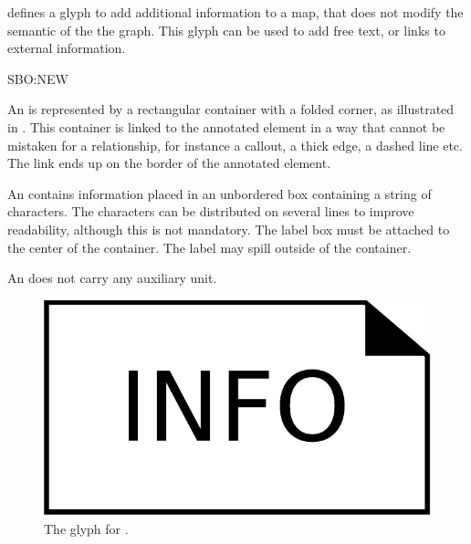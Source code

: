 
\SBGNERLone defines a glyph to add additional information to a map, that does not modify the semantic of the the graph. This glyph can be used to add free text, or links to external information.

\begin{glyphDescription}

\glyphSboTerm SBO:NEW

\glyphContainer An  is represented by a rectangular container with a folded corner, as illustrated in . This container is linked to the annotated element in a way that cannot be mistaken for a relationship, for instance a callout, a thick edge, a dashed line etc. The link ends up on the border of the annotated element.

\glyphLabel An  contains information placed in an unbordered box containing a string of characters.  The characters can be distributed on several lines to improve readability, although this is not mandatory.  The label box must be attached to the center of the container. The label may spill outside of the container. 

\glyphAux An  does not carry any auxiliary unit.
\end{glyphDescription}

\begin{figure}[H]
  \centering
  \includegraphics[scale = 0.3]{images/annotation}
  \caption{The \ER glyph for .}
  \label{fig:annotation}
\end{figure}


